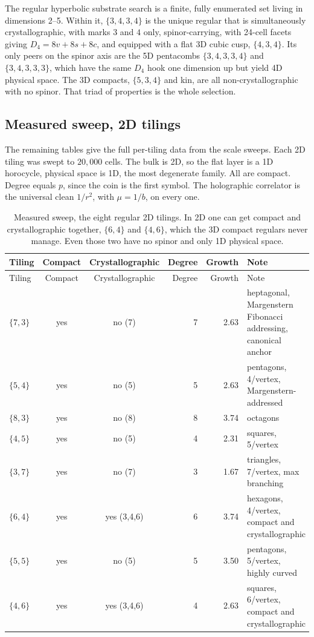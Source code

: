 The regular hyperbolic substrate search is a finite, fully enumerated set living in dimensions 2--5. Within it,
$\{3,4,3,4\}$ is the unique regular that is simultaneously crystallographic, with marks $3$ and $4$ only,
spinor-carrying, with 24-cell facets giving $D_4 = 8v + 8s + 8c$, and equipped with a flat 3D cubic cusp,
$\{4,3,4\}$. Its only peers on the spinor axis are the 5D pentacombs $\{3,4,3,3,4\}$ and $\{3,4,3,3,3\}$, which
have the same $D_4$ hook one dimension up but yield 4D physical space. The 3D compacts, $\{5,3,4\}$ and kin, are
all non-crystallographic with no spinor. That triad of properties is the whole selection.

\subsection{Measured sweep, 2D tilings}

The remaining tables give the full per-tiling data from the scale sweeps. Each 2D tiling was swept to $20{,}000$
cells. The bulk is 2D, so the flat layer is a 1D horocycle, physical space is 1D, the most degenerate family. All
are compact. Degree equals $p$, since the coin is the first symbol. The holographic correlator is the universal
clean $1/r^2$, with $\mu = 1/b$, on every one.

{\small
\begin{longtable}{l c c r r p{2.5in}}
\caption{Measured sweep, the eight regular 2D tilings. In 2D one can get compact and crystallographic together,
$\{6,4\}$ and $\{4,6\}$, which the 3D compact regulars never manage. Even those two have no spinor and only 1D
physical space.}
\label{tab:sweep-2d}\\
\toprule
Tiling & Compact & Crystallographic & Degree & Growth & Note \\
\midrule
\endfirsthead
\toprule
Tiling & Compact & Crystallographic & Degree & Growth & Note \\
\midrule
\endhead
\bottomrule
\endfoot
$\{7,3\}$ & yes & no (7) & 7 & 2.63 & heptagonal, Margenstern Fibonacci addressing, canonical anchor \\
$\{5,4\}$ & yes & no (5) & 5 & 2.63 & pentagons, 4/vertex, Margenstern-addressed \\
$\{8,3\}$ & yes & no (8) & 8 & 3.74 & octagons \\
$\{4,5\}$ & yes & no (5) & 4 & 2.31 & squares, 5/vertex \\
$\{3,7\}$ & yes & no (7) & 3 & 1.67 & triangles, 7/vertex, max branching \\
$\{6,4\}$ & yes & yes (3,4,6) & 6 & 3.74 & hexagons, 4/vertex, compact and crystallographic \\
$\{5,5\}$ & yes & no (5) & 5 & 3.50 & pentagons, 5/vertex, highly curved \\
$\{4,6\}$ & yes & yes (3,4,6) & 4 & 2.63 & squares, 6/vertex, compact and crystallographic \\
\end{longtable}}


